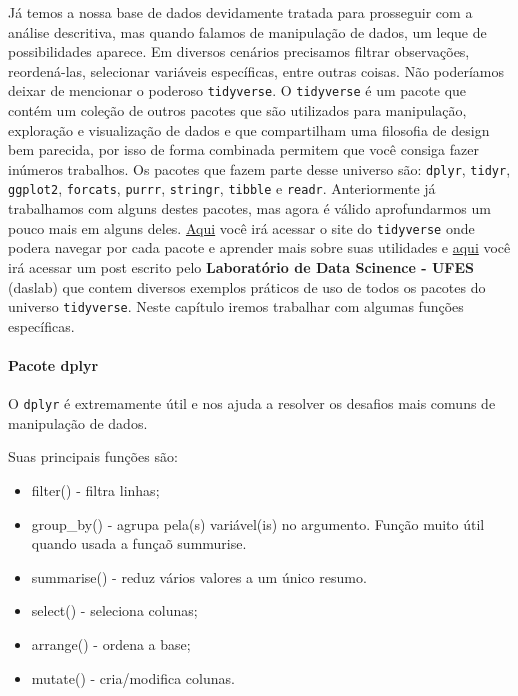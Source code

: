 \documentclass[
  letterpaper,
  DIV=11,
  numbers=noendperiod]{scrreprt}
\let\oldparagraph\paragraph
\renewcommand{\paragraph}[1]{\oldparagraph{#1}\mbox{}}
\begin{document}
Já temos a nossa base de dados devidamente tratada para prosseguir com a
análise descritiva, mas quando falamos de manipulação de dados, um leque
de possibilidades aparece. Em diversos cenários precisamos filtrar
observações, reordená-las, selecionar variáveis específicas, entre
outras coisas. Não poderíamos deixar de mencionar o poderoso
\texttt{tidyverse}. O \texttt{tidyverse} é um pacote que contém um
coleção de outros pacotes que são utilizados para manipulação,
exploração e visualização de dados e que compartilham uma filosofia de
design bem parecida, por isso de forma combinada permitem que você
consiga fazer inúmeros trabalhos. Os pacotes que fazem parte desse
universo são: \texttt{dplyr}, \texttt{tidyr}, \texttt{ggplot2},
\texttt{forcats}, \texttt{purrr}, \texttt{stringr}, \texttt{tibble} e
\texttt{readr}. Anteriormente já trabalhamos com alguns destes pacotes,
mas agora é válido aprofundarmos um pouco mais em alguns deles.
\href{https://www.tidyverse.org/}{Aqui} você irá acessar o site do
\texttt{tidyverse} onde podera navegar por cada pacote e aprender mais
sobre suas utilidades e
\href{https://daslab-ufes.github.io/tidyverse/}{aqui} você irá acessar
um post escrito pelo \textbf{Laboratório de Data Scinence - UFES}
(daslab) que contem diversos exemplos práticos de uso de todos os
pacotes do universo \texttt{tidyverse}. Neste capítulo iremos trabalhar
com algumas funções específicas.

\hypertarget{pacote-dplyr}{%
\paragraph{Pacote dplyr}\label{pacote-dplyr}}

O \texttt{dplyr} é extremamente útil e nos ajuda a resolver os desafios
mais comuns de manipulação de dados.

Suas principais funções são:

\begin{itemize}
\item
  filter() - filtra linhas;
\item
  group\_by() - agrupa pela(s) variável(is) no argumento. Função muito
  útil quando usada a funçaõ summurise.
\item
  summarise() - reduz vários valores a um único resumo.
\item
  select() - seleciona colunas;
\item
  arrange() - ordena a base;
\item
  mutate() - cria/modifica colunas.
\end{itemize}
\end{document}
